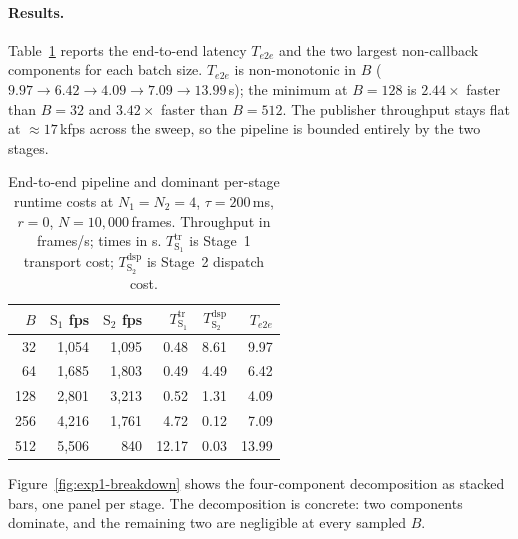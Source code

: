 \paragraph{Results.}
Table~\ref{tab:exp1-summary} reports the end-to-end latency $T_{e2e}$ and
the two largest non-callback components for each batch size.  $T_{e2e}$
is non-monotonic in $B$ ($9.97 \to 6.42 \to 4.09 \to 7.09 \to 13.99$\,s);
the minimum at $B{=}128$ is $2.44\times$ faster than $B{=}32$ and
$3.42\times$ faster than $B{=}512$.  The publisher throughput stays flat
at $\approx 17$\,kfps across the sweep, so the pipeline is bounded
entirely by the two stages.

\begin{table}[t]
\centering
\caption{End-to-end pipeline and dominant per-stage runtime costs at
$N_1{=}N_2{=}4$, $\tau{=}200$\,ms, $r{=}0$, $N{=}10{,}000$\,frames.
Throughput in frames/s; times in s.  $T_{\text{S}_1}^{\text{tr}}$ is
Stage~1 transport cost; $T_{\text{S}_2}^{\text{dsp}}$ is Stage~2 dispatch
cost.}
\label{tab:exp1-summary}
\small
\begin{tabular}{rrrrrr}
\toprule
$B$ & $\text{S}_1$ fps & $\text{S}_2$ fps & $T_{\text{S}_1}^{\text{tr}}$ & $T_{\text{S}_2}^{\text{dsp}}$ & $T_{e2e}$ \\
\midrule
 32 & 1{,}054 & 1{,}095 &  0.48 &  8.61 &  9.97 \\
 64 & 1{,}685 & 1{,}803 &  0.49 &  4.49 &  6.42 \\
128 & 2{,}801 & 3{,}213 &  0.52 &  1.31 &  4.09 \\
256 & 4{,}216 & 1{,}761 &  4.72 &  0.12 &  7.09 \\
512 & 5{,}506 &   840   & 12.17 &  0.03 & 13.99 \\
\bottomrule
\end{tabular}
\end{table}

Figure~\ref{fig:exp1-breakdown} shows the four-component decomposition as
stacked bars, one panel per stage.  The decomposition is concrete: two
components dominate, and the remaining two are negligible at every
sampled $B$.

